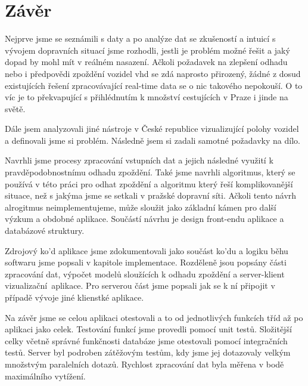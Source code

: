 \chapter*{Závěr}

Nejprve jsme se seznámili s daty a po analýze dat se zkušeností a intuicí s vývojem dopravních situací jsme rozhodli, jestli je problém možné řešit a jaký dopad by mohl mít v reálném nasazení. Ačkoli požadavek na zlepšení odhadu nebo i předpovědi zpoždění vozidel \gls{vhd} se zdá naprosto přirozený, žádné z dosud existujících řešení zpracovávající real-time data se o nic takového nepokouší. O to víc je to překvapující s přihlédnutím k množství cestujících v Praze i jinde na světě.

\bigbreak

Dále jsem analyzovali jiné nástroje v České republice vizualizující polohy vozidel a definovali jsme si problém. Následně jsem si zadali samotné požadavky na dílo.

\bigbreak

Navrhli jsme procesy zpracování vstupních dat a jejich následné využití k pravděpodobnostnímu odhadu zpoždění. Také jsme navrhli algoritmus, který se používá v této práci pro odhat zpoždění a algoritmu který řeší komplikovanější situace, než s jakýma jsme se setkali v pražské dopravní síti. Ačkoli tento návrh alrogitmus neimplementujeme, může sloužit jako základní kámen pro další výzkum a obdobné aplikace. Součástí návrhu je design front-endu aplikace a databázové struktury.

\bigbreak

Zdrojový ko'd aplikace jsme zdokumentovali jako součást ko'du a logiku běhu softwaru jsme popsali v kapitole implementace. Rozděleně jsou popsány části zpracování dat, výpočet modelů sloužících k odhadu zpoždění a server-klient vizualizační aplikace. Pro serverou část jsme popsali jak se k ní připojit v případě vývoje jiné klienstké aplikace.

\bigbreak

Na závěr jsme se celou aplikaci otestovali a to od jednotlivých funkcích tříd až po aplikaci jako celek. Testování funkcí jsme provedli pomocí unit testů. Složitější celky včetně správné funkčnosti databáze jsme otestovali pomocí integračních testů. Server byl podroben zátěžovým testům, kdy jsme jej dotazovaly velkým množstvým paralelních dotazů. Rychlost zpracování dat byla měřena v bodě maximálního vytížení.

\bigbreak


